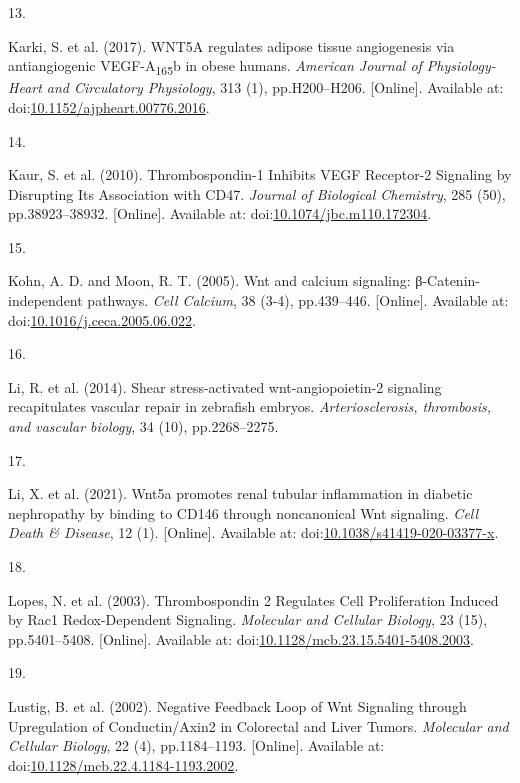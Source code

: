 \documentclass[
  11pt,
]{article}
\newlength{\cslhangindent}
\newlength{\csllabelwidth}
\newlength{\cslentryspacingunit} %
\newenvironment{CSLReferences}[2] %
 {%
  \setlength{\parindent}{0pt}
  \ifodd #1
  \let\oldpar\par
  \def\par{\hangindent=\cslhangindent\oldpar}
  \fi
  \setlength{\parskip}{#2\cslentryspacingunit}
 }%
 {}
\newcommand{\CSLLeftMargin}[1]{\parbox[t]{\csllabelwidth}{#1}}
\newcommand{\CSLRightInline}[1]{\parbox[t]{\linewidth - \csllabelwidth}{#1}\break}
\begin{document}
\begin{CSLReferences}{0}{0}
\leavevmode{}%
\CSLLeftMargin{13. }
\CSLRightInline{Karki, S. {et al.} (2017). {WNT5A regulates adipose tissue angiogenesis via antiangiogenic VEGF-A{\textsubscript{165}}b in obese humans}. \emph{American Journal of Physiology-Heart and Circulatory Physiology}, 313 (1), pp.H200--H206. {[}Online{]}. Available at: doi:\href{https://doi.org/10.1152/ajpheart.00776.2016}{10.1152/ajpheart.00776.2016}.}

\leavevmode{}%
\CSLLeftMargin{14. }
\CSLRightInline{Kaur, S. {et al.} (2010). {Thrombospondin-1 Inhibits VEGF Receptor-2 Signaling by Disrupting Its Association with CD47}. \emph{Journal of Biological Chemistry}, 285 (50), pp.38923--38932. {[}Online{]}. Available at: doi:\href{https://doi.org/10.1074/jbc.m110.172304}{10.1074/jbc.m110.172304}.}

\leavevmode{}%
\CSLLeftMargin{15. }
\CSLRightInline{Kohn, A. D. and Moon, R. T. (2005). {Wnt and calcium signaling: β-Catenin-independent pathways}. \emph{Cell Calcium}, 38 (3-4), pp.439--446. {[}Online{]}. Available at: doi:\href{https://doi.org/10.1016/j.ceca.2005.06.022}{10.1016/j.ceca.2005.06.022}.}

\leavevmode{}%
\CSLLeftMargin{16. }
\CSLRightInline{Li, R. {et al.} (2014). {Shear stress-activated wnt-angiopoietin-2 signaling recapitulates vascular repair in zebrafish embryos}. \emph{Arteriosclerosis, thrombosis, and vascular biology}, 34 (10), pp.2268--2275.}

\leavevmode{}%
\CSLLeftMargin{17. }
\CSLRightInline{Li, X. {et al.} (2021). {Wnt5a promotes renal tubular inflammation in diabetic nephropathy by binding to CD146 through noncanonical Wnt signaling}. \emph{Cell Death \& Disease}, 12 (1). {[}Online{]}. Available at: doi:\href{https://doi.org/10.1038/s41419-020-03377-x}{10.1038/s41419-020-03377-x}.}

\leavevmode{}%
\CSLLeftMargin{18. }
\CSLRightInline{Lopes, N. {et al.} (2003). {Thrombospondin 2 Regulates Cell Proliferation Induced by Rac1 Redox-Dependent Signaling}. \emph{Molecular and Cellular Biology}, 23 (15), pp.5401--5408. {[}Online{]}. Available at: doi:\href{https://doi.org/10.1128/mcb.23.15.5401-5408.2003}{10.1128/mcb.23.15.5401-5408.2003}.}

\leavevmode{}%
\CSLLeftMargin{19. }
\CSLRightInline{Lustig, B. {et al.} (2002). {Negative Feedback Loop of Wnt Signaling through Upregulation of Conductin/Axin2 in Colorectal and Liver Tumors}. \emph{Molecular and Cellular Biology}, 22 (4), pp.1184--1193. {[}Online{]}. Available at: doi:\href{https://doi.org/10.1128/mcb.22.4.1184-1193.2002}{10.1128/mcb.22.4.1184-1193.2002}.}


\end{CSLReferences}
\end{document}
